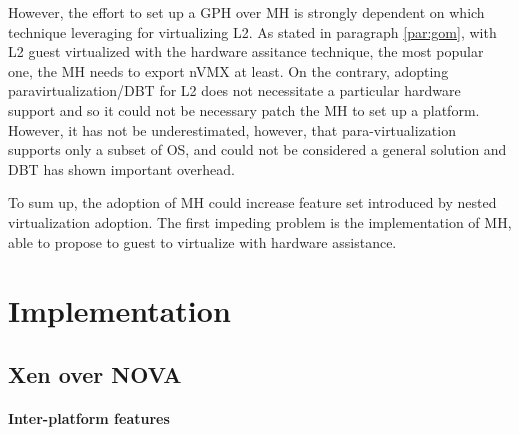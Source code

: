 \documentclass{acm_proc_article-sp} %
\begin{document}
However, the effort to set up a GPH over MH is strongly dependent on which technique leveraging for virtualizing L2. As stated in paragraph \ref{par:gom}, with L2 guest virtualized with the hardware assitance technique, the most popular one, the MH needs to export nVMX at least. 
On the contrary, adopting paravirtualization/DBT for L2 does not necessitate a particular hardware support and so it could not be necessary patch the MH to set up a platform. 
However, it has not be underestimated, however, that para-virtualization supports only a subset of OS, and could not be considered a general solution and DBT has shown important overhead.

To sum up,  the adoption of MH could  increase feature set introduced by nested virtualization adoption. The first impeding problem is the implementation of MH, able to propose to guest to virtualize with hardware assistance.

\section{Implementation}
\subsection{Xen over NOVA}
\paragraph{Inter-platform features}
\end{document}
